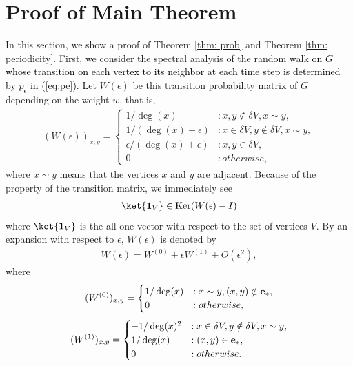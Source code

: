 \documentclass[12pt]{article}
\numberwithin{lemma}{section}
\numberwithin{proposition}{section}
\numberwithin{remark}{section}
\numberwithin{definition}{section}
\newcommand{\red}{\textcolor{black}}
\begin{document}
\section{Proof of Main Theorem}
In this section, we show a proof of Theorem \ref{thm: prob} and Theorem \ref{thm: periodicity}. First, we consider the spectral analysis of the random walk \red{on $G$ whose transition on each vertex to its neighbor at each time step is determined by $p_\epsilon$ in (\ref{eq:pe})}. Let $W(\epsilon)$ be this transition probability matrix of $G$ depending on the weight $w$, that is, 
\begin{align*}
    (W(\epsilon))_{x,y}=
    \begin{cases}
        1/\deg(x) &: x,y \notin \delta V, x\sim y, \\
        1/(\deg(x)+\epsilon) &: x \in \delta V, y \notin \delta V, x \sim y,\\
        \epsilon/(\deg(x)+\epsilon) &: x,y \in \delta V, \\
        0 &: otherwise,
    \end{cases}
\end{align*}
where $x \sim y$ means that the vertices $x$ and $y$ are \red{adjacent}.
Because of the property of the transition matrix, we immediately see
\begin{align}
    \label{eq: e_vec of epsilon}
    \ket{\boldsymbol{1}_V} \in \mathrm{Ker}(W(\epsilon)-I)
\end{align}
where $\ket{\boldsymbol{1}_{V}}$ is the all-one vector with respect to the set of \red{vertices} $V$. 
By an expansion with respect to $\epsilon$, $W(\epsilon)$ is denoted by
\begin{align*}
    W(\epsilon)=W^{(0)}+\epsilon W^{(1)}+O(\epsilon^{2}),
\end{align*}
where
\begin{align*}
    (W^{(0)})_{x,y}=
    \begin{cases}
        1/\deg(x) &: x\sim y, (x,y) \notin \bold{e}_{*}, \\
        0 &: otherwise,
    \end{cases}
\end{align*}
\begin{align*}
    (W^{(1)})_{x,y}=
    \begin{cases}
        -1/\deg(x)^{2} &: x \in \delta V, y \notin \delta V,   x\sim y,\\
        1/\deg(x) &: (x,y) \in \bold{e}_{*},\\
        0 &: otherwise.
    \end{cases}
\end{align*}
\end{document}
